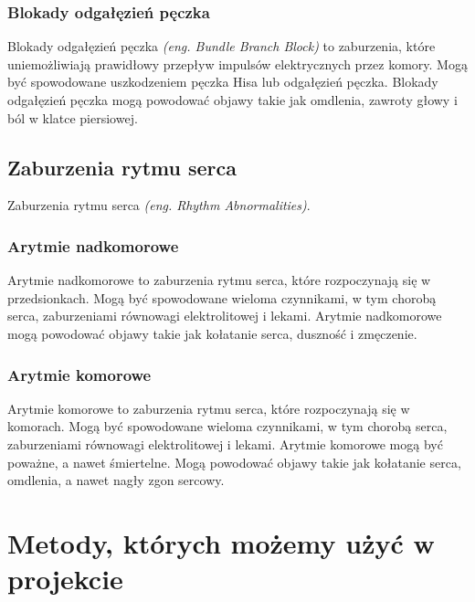 \documentclass[12pt,a4paper]{article}
\begin{document}
\subsubsection{Blokady odgałęzień pęczka}
Blokady odgałęzień pęczka \textit{(eng. Bundle Branch Block)} to zaburzenia, które uniemożliwiają prawidłowy przepływ impulsów elektrycznych przez komory. Mogą być spowodowane uszkodzeniem pęczka Hisa lub odgałęzień pęczka. Blokady odgałęzień pęczka mogą powodować objawy takie jak omdlenia, zawroty głowy i ból w klatce piersiowej.


\subsection{Zaburzenia rytmu serca}
Zaburzenia rytmu serca \textit{(eng. Rhythm Abnormalities)}.

\subsubsection{Arytmie nadkomorowe} 
Arytmie nadkomorowe to zaburzenia rytmu serca, które rozpoczynają się w przedsionkach. Mogą być spowodowane wieloma czynnikami, w tym chorobą serca, zaburzeniami równowagi elektrolitowej i lekami. Arytmie nadkomorowe mogą powodować objawy takie jak kołatanie serca, duszność i zmęczenie.

\subsubsection{Arytmie komorowe} 
Arytmie komorowe to zaburzenia rytmu serca, które rozpoczynają się w komorach. Mogą być spowodowane wieloma czynnikami, w tym chorobą serca, zaburzeniami równowagi elektrolitowej i lekami. Arytmie komorowe mogą być poważne, a nawet śmiertelne. Mogą powodować objawy takie jak kołatanie serca, omdlenia, a nawet nagły zgon sercowy.


\section{Metody, których możemy użyć w projekcie}

\end{document}
